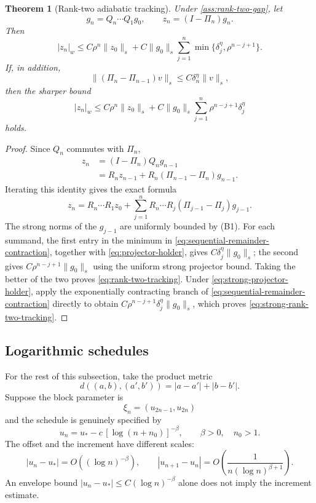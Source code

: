 \documentclass[11pt]{article}
\newtheorem{theorem}{Theorem}[section]
\theoremstyle{definition}
\theoremstyle{remark}
\begin{document}
\begin{theorem}[Rank-two adiabatic tracking]\label{thm:rank-two-tracking}
Under \cref{ass:rank-two-gap}, let
\[
    g_n=Q_n\cdots Q_1g_0,
    \qquad z_n=(I-\Pi_n)g_n.
\]
Then
\begin{equation}\label{eq:rank-two-tracking}
    |z_n|_w
    \le C\rho^n\|z_0\|_s
      +C\|g_0\|_s\sum_{j=1}^n
        \min\{\delta_j^\eta,\rho^{n-j+1}\}.
\end{equation}
If, in addition,
\begin{equation}\label{eq:strong-projector-holder}
    \|(\Pi_n-\Pi_{n-1})v\|_s
    \le C\delta_n^\eta\|v\|_s,
\end{equation}
then the sharper bound
\begin{equation}\label{eq:strong-rank-two-tracking}
    |z_n|_w
    \le C\rho^n\|z_0\|_s
      +C\|g_0\|_s\sum_{j=1}^n
        \rho^{n-j+1}\delta_j^\eta
\end{equation}
holds.
\end{theorem}

\begin{proof}
Since $Q_n$ commutes with $\Pi_n$,
\begin{align*}
    z_n
    &=(I-\Pi_n)Q_ng_{n-1}\\
    &=R_nz_{n-1}
      +R_n(\Pi_{n-1}-\Pi_n)g_{n-1}.
\end{align*}
Iterating this identity gives the exact formula
\[
    z_n=R_n\cdots R_1z_0
      +\sum_{j=1}^n R_n\cdots R_j
       (\Pi_{j-1}-\Pi_j)g_{j-1}.
\]
The strong norms of the $g_{j-1}$ are uniformly bounded by (B1).  For each summand, the first entry in the minimum in \eqref{eq:sequential-remainder-contraction}, together with \eqref{eq:projector-holder}, gives $C\delta_j^\eta\|g_0\|_s$; the second gives $C\rho^{n-j+1}\|g_0\|_s$ using the uniform strong projector bound.  Taking the better of the two proves \eqref{eq:rank-two-tracking}.  Under \eqref{eq:strong-projector-holder}, apply the exponentially contracting branch of \eqref{eq:sequential-remainder-contraction} directly to obtain $C\rho^{n-j+1}\delta_j^\eta\|g_0\|_s$, which proves \eqref{eq:strong-rank-two-tracking}.
\end{proof}

\subsection{Logarithmic schedules}

For the rest of this subsection, take the product metric
\[
    d((a,b),(a',b'))=|a-a'|+|b-b'|.
\]
Suppose the block parameter is
\[
    \xi_n=(u_{2n-1},u_{2n})
\]
and the schedule is genuinely specified by
\begin{equation}\label{eq:log-schedule}
    u_n=u_*-c\,[\log(n+n_0)]^{-\beta},
    \qquad \beta>0,\quad n_0>1.
\end{equation}
The offset and the increment have different scales:
\begin{equation}\label{eq:offset-increment}
    |u_n-u_*|=O((\log n)^{-\beta}),
    \qquad
    |u_{n+1}-u_n|
    =O\!\left(\frac1{n(\log n)^{\beta+1}}\right).
\end{equation}
An envelope bound $|u_n-u_*|\le C(\log n)^{-\beta}$ alone does not imply the increment estimate.
\end{document}
